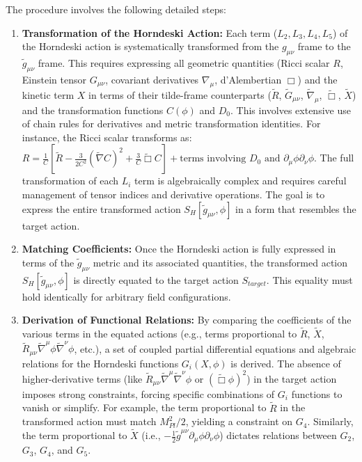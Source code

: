 \documentclass[twocolumn]{aastex631}
\begin{document}
The procedure involves the following detailed steps:
\begin{enumerate}
    \item \textbf{Transformation of the Horndeski Action:} Each term ($L_2, L_3, L_4, L_5$) of the Horndeski action is systematically transformed from the $g_{\mu\nu}$ frame to the $\tilde{g}_{\mu\nu}$ frame. This requires expressing all geometric quantities (Ricci scalar $R$, Einstein tensor $G_{\mu\nu}$, covariant derivatives $\nabla_\mu$, d'Alembertian $\Box$) and the kinetic term $X$ in terms of their tilde-frame counterparts ($\tilde{R}$, $\tilde{G}_{\mu\nu}$, $\tilde{\nabla}_\mu$, $\tilde{\Box}$, $\tilde{X}$) and the transformation functions $C(\phi)$ and $D_0$. This involves extensive use of chain rules for derivatives and metric transformation identities. For instance, the Ricci scalar transforms as:
    $R = \frac{1}{C} \left[ \tilde{R} - \frac{3}{2C^2} (\tilde{\nabla} C)^2 + \frac{3}{C} \tilde{\Box} C \right] + \text{terms involving } D_0 \text{ and } \partial_\mu\phi \partial_\nu\phi$.
    The full transformation of each $L_i$ term is algebraically complex and requires careful management of tensor indices and derivative operations. The goal is to express the entire transformed action $S_H[\tilde{g}_{\mu\nu}, \phi]$ in a form that resembles the target action.

    \item \textbf{Matching Coefficients:} Once the Horndeski action is fully expressed in terms of the $\tilde{g}_{\mu\nu}$ metric and its associated quantities, the transformed action $S_H[\tilde{g}_{\mu\nu}, \phi]$ is directly equated to the target action $S_{target}$. This equality must hold identically for arbitrary field configurations.

    \item \textbf{Derivation of Functional Relations:} By comparing the coefficients of the various terms in the equated actions (e.g., terms proportional to $\tilde{R}$, $\tilde{X}$, $\tilde{R}_{\mu\nu}\tilde{\nabla}^\mu\phi\tilde{\nabla}^\nu\phi$, etc.), a set of coupled partial differential equations and algebraic relations for the Horndeski functions $G_i(X, \phi)$ is derived. The absence of higher-derivative terms (like $\tilde{R}_{\mu\nu}\tilde{\nabla}^\mu\tilde{\nabla}^\nu\phi$ or $(\tilde{\Box}\phi)^2$) in the target action imposes strong constraints, forcing specific combinations of $G_i$ functions to vanish or simplify. For example, the term proportional to $\tilde{R}$ in the transformed action must match $M_{Pl}^2/2$, yielding a constraint on $G_4$. Similarly, the term proportional to $\tilde{X}$ (i.e., $-\frac{1}{2}\tilde{g}^{\mu\nu}\partial_\mu\phi\partial_\nu\phi$) dictates relations between $G_2$, $G_3$, $G_4$, and $G_5$.


\end{enumerate}
\end{document}

